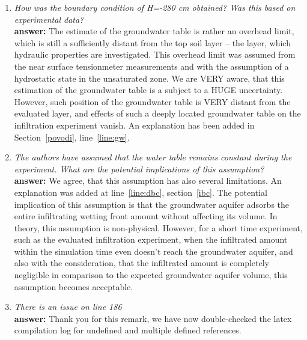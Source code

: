 \documentclass[final,3p, 11pt, a4paper]{elsarticle}
\begin{document}
\begin{enumerate}
\item {\it How was the boundary condition of H=-280 cm obtained? Was this based on experimental data?} \\
{\bf  answer:} The estimate of the groundwater table is rather an overhead limit, which is still a sufficiently distant from the top soil layer -- the layer, which hydraulic properties are investigated. This overhead limit was assumed from the near surface tensionmeter measurements and with the assumption of a hydrostatic state in the unsaturated zone. We are VERY aware, that this estimation of the groundwater table is a subject to a HUGE uncertainty. However, such position of the groundwater table is VERY distant from the evaluated layer, and effects of such a deeply located  groundwater table on the infiltration experiment vanish. An explanation has been added in Section~\ref{povodi}, line~\ref{line:gw}.
\item {\it   The authors have assumed that the water table remains constant during the experiment. What are the potential implications of this assumption?} \\
{\bf  answer:} We agree, that this assumption has also several limitations. An explanation was added at line~\ref{line:dbc}, section~\ref{ibc}. The potential implication of this assumption is that the groundwater aquifer adsorbs the entire infiltrating wetting front amount without affecting its volume. In theory, this assumption is non-physical. However, for a short time experiment, such as the evaluated infiltration experiment, when the infiltrated amount within the simulation time even doesn't reach the groundwater aquifer, and also with the consideration, that the infiltrated amount is completely negligible in comparison to the expected groundwater aquifer volume, this assumption becomes acceptable. 

\item {\it There is an issue on line 186} \\
{\bf  answer:} Thank you for this remark, we have now double-checked the latex compilation log for undefined and multiple defined references.


\end{enumerate}
\end{document}
